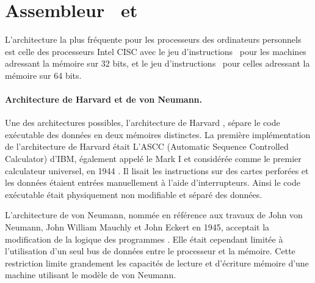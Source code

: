 \section{Assembleur \xq\ et \xs}
L'architecture la plus fréquente pour les processeurs des ordinateurs personnels est celle des processeurs Intel CISC avec le jeu d'instructions \xq\ pour les machines adressant la mémoire sur 32 bits, et le jeu d'instructions \xs\ pour celles adressant la mémoire sur 64 bits.

\paragraph{Architecture de Harvard et de von Neumann.}
Une des architectures possibles, l'architecture de Harvard \cite{ibm_mark1}, sépare le code exécutable des données en deux mémoires distinctes.
La première implémentation de l'architecture de Harvard était L’ASCC (Automatic Sequence Controlled Calculator) d'IBM, également appelé le Mark I et considérée comme le premier calculateur universel, en 1944 . 
Il lisait les instructions sur des cartes perforées et les données étaient entrées manuellement à l'aide d'interrupteurs. 
Ainsi le code exécutable était physiquement non modifiable et séparé des données. 

L'architecture de von Neumann, nommée en référence aux travaux de John von Neumann, John William Mauchly et John Eckert en 1945, acceptait la modification de la logique des programmes \cite{timsit}.
Elle était cependant limitée à l'utilisation d'un seul bus de données entre le processeur et la mémoire.
Cette restriction limite grandement les capacités de lecture et d'écriture mémoire d'une machine utilisant le modèle de von Neumann.

